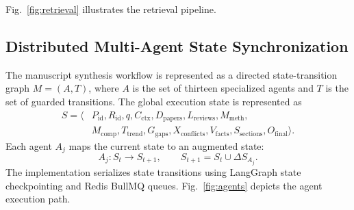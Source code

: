 \documentclass[conference]{IEEEtran}
\begin{document}
 Fig.~\ref{fig:retrieval} illustrates the retrieval pipeline.

\subsection{Distributed Multi-Agent State Synchronization}
The manuscript synthesis workflow is represented as a directed state-transition graph $M = (A, T)$, where $A$ is the set of thirteen specialized agents and $T$ is the set of guarded transitions. The global execution state is represented as
\begin{align}
S = \langle &P_{\mathrm{id}}, R_{\mathrm{id}}, q, C_{\mathrm{ctx}}, D_{\mathrm{papers}}, L_{\mathrm{reviews}}, M_{\mathrm{meth}}, \nonumber\\
&M_{\mathrm{comp}}, T_{\mathrm{trend}}, G_{\mathrm{gaps}}, X_{\mathrm{conflicts}}, V_{\mathrm{facts}}, S_{\mathrm{sections}}, O_{\mathrm{final}}\rangle.
\label{eq:state}
\end{align}
Each agent $A_j$ maps the current state to an augmented state:
\begin{equation}
A_j: S_t \longrightarrow S_{t+1}, \qquad S_{t+1} = S_t \cup \Delta S_{A_j}.
\label{eq:transition}
\end{equation}
The implementation serializes state transitions using LangGraph state checkpointing and Redis BullMQ queues. Fig.~\ref{fig:agents} depicts the agent execution path.
\end{document}
